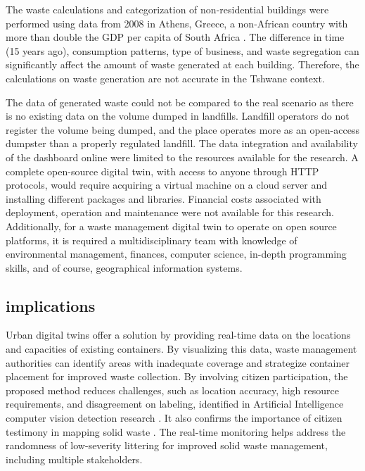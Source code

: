 \documentclass[authoryear,preprint,review,12pt]{elsarticle}
\begin{document}
    The waste calculations and categorization of non-residential buildings were performed using data from 2008 in Athens, Greece, a non-African country with more than double the GDP per capita of South Africa \cite{Bank2021}. The difference in time (15 years ago), consumption patterns, type of business, and waste segregation can significantly affect the amount of waste generated at each building. Therefore, the calculations on waste generation are not accurate in the Tshwane context.

    The data of generated waste could not be compared to the real scenario as there is no existing data on the volume dumped in landfills. Landfill operators do not register the volume being dumped, and the place operates more as an open-access dumpster than a properly regulated landfill. The data integration and availability of the dashboard online were limited to the resources available for the research. A complete open-source digital twin, with access to anyone through HTTP protocols, would require acquiring a virtual machine on a cloud server and installing different packages and libraries. Financial costs associated with deployment, operation and maintenance were not available for this research. Additionally, for a waste management digital twin to operate on open source platforms, it is required a multidisciplinary team with knowledge of environmental management, finances, computer science, in-depth programming skills, and of course, geographical information systems.

    \subsection{implications} \label{subsec:implications}

    Urban digital twins offer a solution by providing real-time data on the locations and capacities of existing containers. By visualizing this data, waste management authorities can identify areas with inadequate coverage and strategize container placement for improved waste collection.
    By involving citizen participation, the proposed method reduces challenges, such as location accuracy, high resource requirements, and disagreement on labeling, identified in Artificial Intelligence computer vision detection research \citep{Moral2022}. It also confirms the importance of citizen testimony in mapping solid waste \citep{al-joburiMappingBahrainSubsurface2018}. The real-time monitoring helps address the randomness of low-severity littering for improved solid waste management, including multiple stakeholders.
\end{document}
